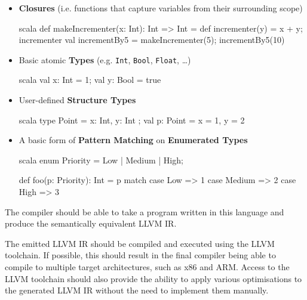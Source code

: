 \begin{itemize}
    \item \textbf{Closures} (i.e. functions that capture variables from their surrounding scope)
          \begin{code}{scala}
                def makeIncrementer(x: Int): Int => Int = {
                    def incrementer(y) = x + y;
                    incrementer
                }
                val incrementBy5 = makeIncrementer(5);
                incrementBy5(10)
          \end{code}

    \item Basic atomic \textbf{Types}
          (e.g. \texttt{Int}, \texttt{Bool}, \texttt{Float}, \dots)
          \begin{code}{scala}
              val x: Int = 1; val y: Bool = true
          \end{code}

    \item User-defined \textbf{Structure Types}
          \begin{code}{scala}
              type Point = { x: Int, y: Int };
              val p: Point = { x = 1, y = 2 }
          \end{code}

    \item A basic form of \textbf{Pattern Matching} on \textbf{Enumerated Types}
          \begin{code}{scala}
              enum Priority = Low | Medium | High;

              def foo(p: Priority): Int = p match {
                  case Low => 1
                  case Medium => 2
                  case High => 3
              }
          \end{code}
\end{itemize}

The compiler should be able to take a program written in this language and produce the semantically
equivalent LLVM IR.

The emitted LLVM IR should be compiled and executed using the LLVM toolchain. If possible, this
should result in the final compiler being able to compile to multiple target architectures, such as
x86 and ARM. Access to the LLVM toolchain should also provide the ability to apply various
optimisations to the generated LLVM IR without the need to implement them manually.
